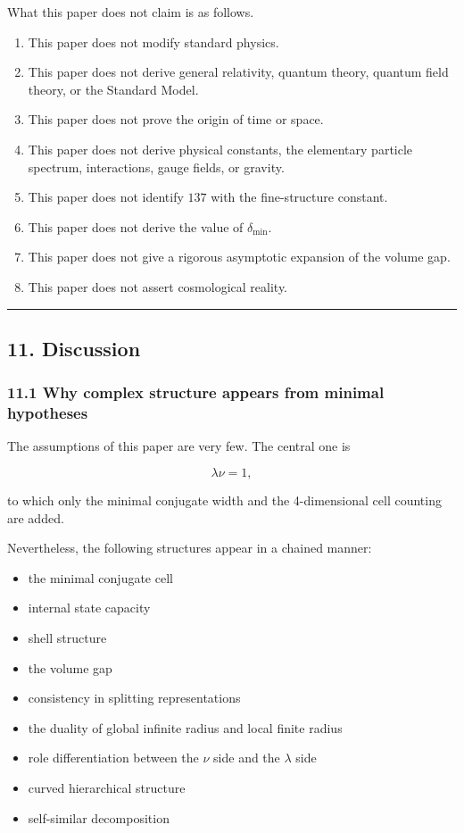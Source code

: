 \documentclass[
]{article}
\providecommand{\tightlist}{%
  \setlength{\itemsep}{0pt}\setlength{\parskip}{0pt}}
\begin{document}
What this paper does not claim is as follows.

\begin{enumerate}
\def\labelenumi{\arabic{enumi}.}
\tightlist
\item
  This paper does not modify standard physics.
\item
  This paper does not derive general relativity, quantum theory, quantum
  field theory, or the Standard Model.
\item
  This paper does not prove the origin of time or space.
\item
  This paper does not derive physical constants, the elementary particle
  spectrum, interactions, gauge fields, or gravity.
\item
  This paper does not identify \(137\) with the fine-structure constant.
\item
  This paper does not derive the value of \(\delta_{\min}\).
\item
  This paper does not give a rigorous asymptotic expansion of the volume
  gap.
\item
  This paper does not assert cosmological reality.
\end{enumerate}

\begin{center}\rule{0.5\linewidth}{0.5pt}\end{center}

\subsection{11. Discussion}\label{discussion}

\subsubsection{11.1 Why complex structure appears from minimal
hypotheses}\label{why-complex-structure-appears-from-minimal-hypotheses}

The assumptions of this paper are very few. The central one is

\[
\lambda\nu=1,
\]

to which only the minimal conjugate width and the 4-dimensional cell
counting are added.

Nevertheless, the following structures appear in a chained manner:

\begin{itemize}
\tightlist
\item
  the minimal conjugate cell
\item
  internal state capacity
\item
  shell structure
\item
  the volume gap
\item
  consistency in splitting representations
\item
  the duality of global infinite radius and local finite radius
\item
  role differentiation between the \(\nu\) side and the \(\lambda\) side
\item
  curved hierarchical structure
\item
  self-similar decomposition
\end{itemize}
\end{document}
